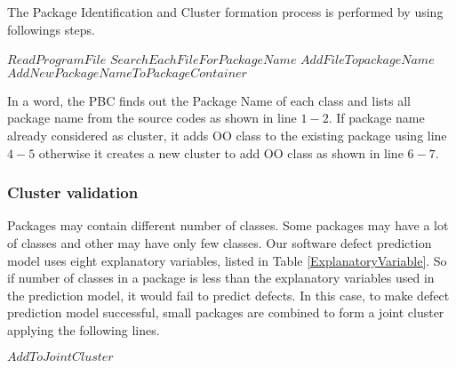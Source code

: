\documentclass[12pt]{report}
\begin{document}
The Package Identification and Cluster formation process is performed by using followings steps.  
\begin{algorithm}
\label{Package_Identification_and_Cluster_formation}
\begin{algorithmic}[1]

			\STATE $Read Program File$ 
			\STATE $Search Each File For PackageName $  
				\STATE $Add File To packageName$
			\ELSE{  }
			\STATE $Add New PackageName To PackageContainer$
			\ENDIF
	\ENDFOR
	

\end{algorithmic}
\end{algorithm}
In a word, the PBC finds out the Package Name of each class and lists all package name from the source codes as shown in line $1-2$. If package name already considered as cluster, it adds OO class to the existing package using line $4-5$ otherwise it creates a new cluster to add OO class as shown in line $6-7$.     


\subsubsection{Cluster validation} Packages may contain different number of classes. Some packages may have a lot of classes and other may have only few classes. Our software defect prediction model uses eight explanatory variables, listed in Table \ref{ExplanatoryVariable}. So if number of classes in a package is less than the explanatory variables used in the prediction model, it would fail to predict defects. In this case, to make defect prediction model successful, small packages are combined to form a joint cluster applying the following lines. 

\begin{algorithm}
\label{PackageLevel}
\begin{algorithmic}[1]
	
			\STATE $Add To Joint Cluster$
		\ENDIF
	\ENDFOR
\end{algorithmic}
\end{algorithm}
\end{document}
